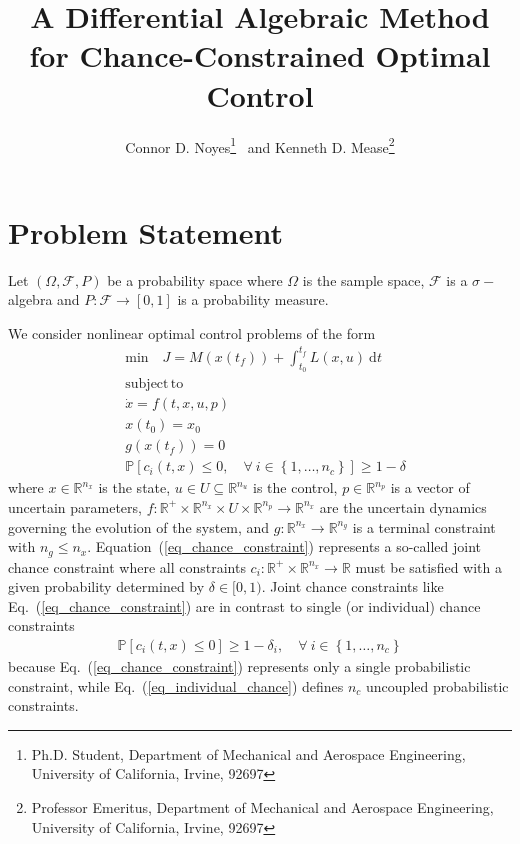 \documentclass[letterpaper, preprint, paper,11pt]{AAS}	%
\begin{document}
\author{Connor D. Noyes\thanks{Ph.D. Student, Department of Mechanical and Aerospace Engineering, University of California, Irvine, 92697} \ and Kenneth D. Mease\thanks{Professor Emeritus, Department of Mechanical and Aerospace Engineering, University of California, Irvine, 92697}} %
\title{A Differential Algebraic Method for Chance-Constrained Optimal Control}
\maketitle
	
	\section{Problem Statement}
	Let $(\Omega, \mathcal{F}, P)$ be a probability space where $ \Omega $ is the sample space, $ \mathcal{F} $ is a $\sigma-$algebra and $P\colon \mathcal{F}\to[0,1]$ is a probability measure.
	
	We consider nonlinear optimal control problems of the form
	\begin{align}
	&\mathrm{min} \quad J = M(x(t_f)) + \int_{t_0}^{t_f} L(x, u)\ \mathrm{d}t \label{eq_objective}\\
	&\mathrm{subject\,to\,} \nonumber\\ 
	&\dot{x} = f(t, x, u, p) \\
	&x(t_0) = x_0 \label{eq_initial_cond}\\
	&g(x(t_f)) = 0 \label{eq_terminal_cond} \\
	&\mathbb{P}[c_i(t, x) \le 0, \quad \forall \ i \in \left\lbrace 1,\dots,n_c \right\rbrace ] \ge 1-\delta  \label{eq_chance_constraint}
	\end{align}
	where $x\in\mathbb{R}^{n_x}$ is the state, $u\in U\subseteq\mathbb{R}^{n_u}$ is the control, $p\in\mathbb{R}^{n_p}$ is a vector of uncertain parameters, $f\colon \mathbb{R}^+\times\mathbb{R}^{n_x}\times U \times \mathbb{R}^{n_p}\to \mathbb{R}^{n_x}$ are the uncertain dynamics governing the evolution of the system, and $g\colon\mathbb{R}^{n_x}\to\mathbb{R}^{n_g}$ is a terminal constraint with $n_g\le n_x$. Equation~(\ref{eq_chance_constraint}) represents a so-called joint chance constraint where all constraints $c_i\colon \mathbb{R}^+\times\mathbb{R}^{n_x}\to\mathbb{R}$ must be satisfied with a given probability determined by $\delta\in [0,1)$. 
	Joint chance constraints like Eq.~(\ref{eq_chance_constraint}) are in contrast to single (or individual) chance constraints
	\begin{align}
	\mathbb{P}[c_i(t, x) \le 0 ] \ge 1-\delta_i, \quad \forall\ i \in \left\lbrace 1,\dots,n_c \right\rbrace \label{eq_individual_chance}
	\end{align}
	because Eq.~(\ref{eq_chance_constraint}) represents only a single probabilistic constraint, while Eq.~(\ref{eq_individual_chance}) defines $n_c$ uncoupled probabilistic constraints.
	
\end{document}
